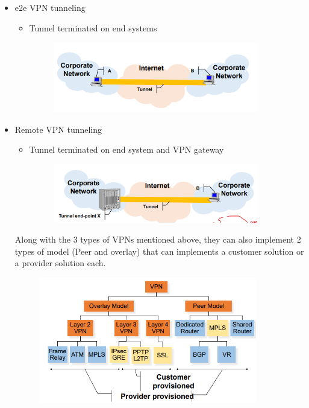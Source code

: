 \documentclass{article}
\begin{document}
\begin{itemize}
\begin{itemize}
\begin{figure}[H]
        \end{figure}
    \end{itemize}
    \item e2e VPN tunneling
    \begin{itemize}
        \item Tunnel terminated on end systems
        \begin{figure}[H]
            \centering
            \includegraphics[width=0.90\textwidth]{figure/e2e.png}
        \end{figure}
    \end{itemize}
    \item Remote VPN tunneling
    \begin{itemize}
        \item Tunnel terminated on end system and VPN gateway
        \begin{figure}[H]
            \centering
            \includegraphics[width=0.90\textwidth]{figure/remote_VPN.png}
        \end{figure}
    \end{itemize}
Along with the 3 types of VPNs mentioned above, they can also implement 2 types of model (Peer and overlay) that can implements a customer solution or a provider solution each.
\begin{figure}[H]
    \centering
    \includegraphics[width=0.90\textwidth]{figure/solutions.png}

\end{figure}
\end{itemize}
\end{document}
